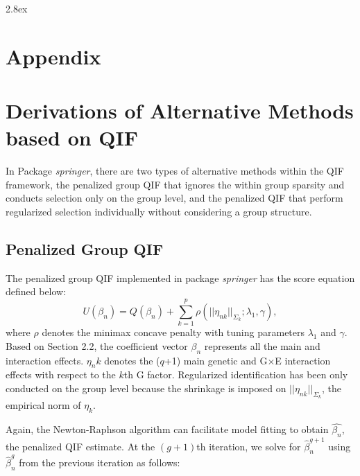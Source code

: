 \documentclass[12pt]{article}
\def\doublespace{\baselineskip=22pt}
\begin{document}
\doublespace
\baselineskip 2.8ex
\section*{Appendix}
\appendix
\section{Derivations of Alternative Methods based on QIF}
\label{appendix:a}

In Package \emph{springer}, there are two types of alternative methods within the QIF framework, the penalized group QIF that ignores the within group sparsity and conducts selection only on the group level, and the penalized QIF that perform regularized selection individually without considering a group structure. 


\subsection{Penalized Group QIF}

The penalized group QIF implemented in package \emph{springer} has the score equation defined below:
\begin{equation*}
	U(\beta_n)=Q(\beta_n)+\sum_{k=1}^{p}\rho(||\eta_{nk}||_{\Sigma_{k}};\lambda_{1},\gamma),
\end{equation*}
where $\rho$ denotes the minimax concave penalty with tuning parameters $\lambda_{1}$ and $\gamma$. Based on Section 2.2, the coefficient vector $\beta_n$ represents all the main and interaction effects. $\eta_nk$
denotes the ($q$+1) main genetic and G$\times$E interaction effects with respect to the $k$th G factor. Regularized identification has been only conducted on the group level because the shrinkage is imposed on  $||\eta_{nk}||_{\Sigma_{k}}$, the empirical norm of $\eta_{k}$.

Again, the Newton-Raphson algorithm can facilitate model fitting to obtain $\hat{\beta_n}$, the penalized QIF estimate. At the $(g+1)$th iteration, we solve for $\hat{\beta}_{n}^{g+1}$ using $\hat{\beta}_{n}^{g}$ from the previous iteration as follows:
\end{document}
